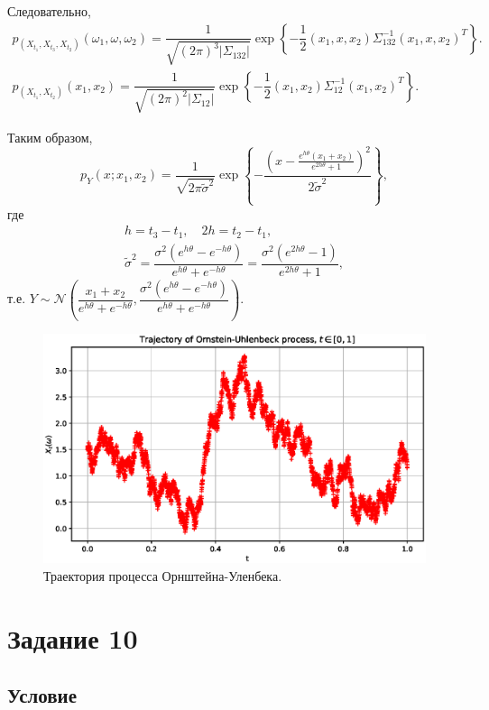 \documentclass[11pt]{report}
\begin{document}
Следовательно,
\begin{gather*}
p_{(X_{t_1},X_{t_3},X_{t_2})}(\omega_1,\omega,\omega_2) = \dfrac{1}{\sqrt{(2\pi)^3|\Sigma_{132}|}}
\exp\left\{ -\dfrac{1}{2} (x_1,x,x_2)\Sigma_{132}^{-1}(x_1,x,x_2)^T \right\}. \\
p_{(X_{t_1},X_{t_2})}(x_1,x_2) = \dfrac{1}{\sqrt{(2\pi)^2|\Sigma_{12}|}}
\exp\left\{ -\dfrac{1}{2}(x_1,x_2)\Sigma_{12}^{-1}(x_1,x_2)^T \right\}.
\end{gather*}

Таким образом,
$$
p_Y(x;x_1,x_2) = \dfrac{1}{\sqrt{2\pi\widetilde\sigma^2}}\exp\left\{ -\dfrac{(x - \frac{e^{h\theta}(x_1+x_2)}{e^{2h\theta}+1})^2}{2\widetilde\sigma^2} \right\},
$$
где
\begin{gather*}
h = t_3-t_1,\quad 2h = t_2-t_1, \\
\widetilde\sigma^2 = \dfrac{\sigma^2(e^{h\theta}-e^{-h\theta})}{e^{h\theta}+e^{-h\theta}} = \dfrac{\sigma^2(e^{2h\theta}-1)}{e^{2h\theta}+1},
\end{gather*}
т.е. $Y\sim\mathcal{N}\left( \dfrac{x_1+x_2}{e^{h\theta}+e^{-h\theta}}, \dfrac{\sigma^2(e^{h\theta}-e^{-h\theta})}{e^{h\theta}+e^{-h\theta}} \right)$.

\begin{figure}[H]
    \centering
    \includegraphics[width=0.9\linewidth]{images/ornstein-uhlenbeck-trajectory.eps}
    \caption{Траектория процесса Орнштейна-Уленбека.}
    \label{fig:ornstein-uhlenbeck-trajectory}
\end{figure}

\section{Задание 10}

\subsection{Условие}
\end{document}
